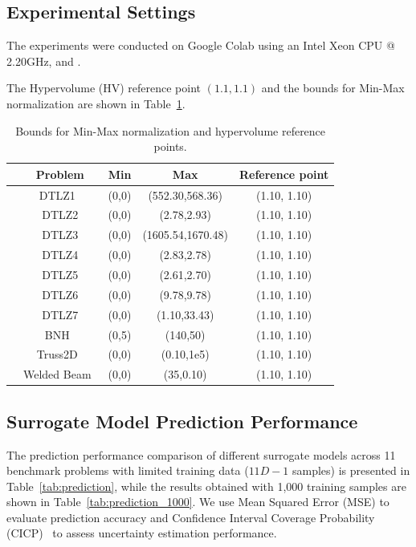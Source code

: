 \documentclass{article}
\begin{document}
\subsection{Experimental Settings}
The experiments were conducted on Google Colab using an Intel Xeon CPU @ 2.20GHz, and .

The Hypervolume (HV) \cite{hypervolume} reference point $(1.1, 1.1)$ and the bounds \cite{benchmark} for Min-Max normalization \cite{indicator} are shown in Table~\ref{tab: reference_points}. 

\begin{table}[htbp]
\caption{Bounds for Min-Max normalization and hypervolume reference points.}
\label{tab: reference_points}
\centering
\begin{tabular}{lcccc}
\toprule
&Problem &Min &Max &Reference point \\
\midrule
&DTLZ1~\cite{opt_dtlz} &(0,0) &(552.30,568.36) &(1.10, 1.10) \\
&DTLZ2 &(0,0) &(2.78,2.93) &(1.10, 1.10) \\
&DTLZ3 &(0,0) &(1605.54,1670.48) &(1.10, 1.10) \\
&DTLZ4 &(0,0) &(2.83,2.78) &(1.10, 1.10) \\
&DTLZ5 &(0,0) &(2.61,2.70) &(1.10, 1.10) \\
&DTLZ6 &(0,0) &(9.78,9.78) &(1.10, 1.10) \\
&DTLZ7 &(0,0) &(1.10,33.43) &(1.10, 1.10) \\
&BNH~\cite{bnh} &(0,5) &(140,50) &(1.10, 1.10) \\
&Truss2D~\cite{truss2d} &(0,0) &(0.10,1e5) &(1.10, 1.10) \\
&Welded Beam~\cite{welded_beam} &(0,0) &(35,0.10) &(1.10, 1.10) \\
\bottomrule
\end{tabular}


\end{table}

\subsection{Surrogate Model Prediction Performance}
The prediction performance comparison of different surrogate models across 11 benchmark problems with limited training data ($11D-1$ samples) is presented in Table~\ref{tab:prediction}, while the results obtained with 1,000 training samples are shown in Table~\ref{tab:prediction_1000}. We use Mean Squared Error (MSE) to evaluate prediction accuracy and Confidence Interval Coverage Probability (CICP)~\cite{cicp} to assess uncertainty estimation performance.
\end{document}
